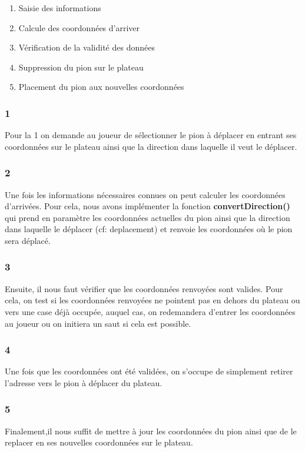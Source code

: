 \documentclass{article}
\begin{document}
\begin{enumerate}
    \item Saisie des informations
    \item Calcule des coordonnées d'arriver
    \item Vérification de la validité des données
    \item Suppression du pion sur le plateau
    \item Placement du pion aux nouvelles coordonnées
\end{enumerate}

\subsubsection{1}
Pour la 1 on demande au joueur de sélectionner le pion à déplacer en entrant ses coordonnées sur le plateau ainsi que la direction dans laquelle il veut le déplacer.

\subsubsection{2}
Une fois les informations nécessaires connues on peut calculer les coordonnées d'arrivées. Pour cela, nous avons implémenter la fonction \textbf{convertDirection()} qui prend en paramètre les coordonnées actuelles du pion ainsi que la direction dans laquelle le déplacer (cf: deplacement) et renvoie les coordonnées où le pion sera déplacé.

\subsubsection{3}
Ensuite, il nous faut vérifier que les coordonnées renvoyées sont valides. Pour cela, on test si les coordonnées renvoyées ne pointent pas en dehors du plateau ou vers une case déjà occupée, auquel cas, on redemandera d'entrer les coordonnées au joueur ou on initiera un saut si cela est possible.

\subsubsection{4}
Une fois que les coordonnées ont été validées, on s'occupe de simplement retirer l'adresse vers le pion à déplacer du plateau. \\

\subsubsection{5}
Finalement,il nous suffit de mettre à jour les coordonnées du pion ainsi que de le replacer en ses nouvelles coordonnées sur le plateau.
\end{document}
